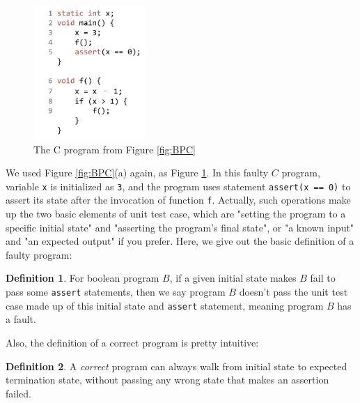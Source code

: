 \documentclass[10pt,journal,final,]{article}
\theoremstyle{definition}
\newtheorem{definition}{Definition}[section]
\begin{document}
\begin{figure}
\centering
\includegraphics[width=1.7in,height=2in]{Fig3-1.jpg}
\caption{The C program from Figure \ref{fig:BPC}}
\label{fig:FC}
\end{figure}

We used Figure \ref{fig:BPC}(a) again, as Figure \ref{fig:FC}. In this faulty $C$ program, variable \lstinline|x| is initialized as \lstinline|3|, and the program uses statement \lstinline|assert(x == 0)| to assert its state after the invocation of function \lstinline|f|.
Actually, such operations make up the two basic elements of unit test case, which are "setting the program to a specific initial state" and "asserting the program's final state", or "a known input" and "an expected output" if you prefer.
Here, we give out the basic definition of a faulty program:

\begin{definition}
\label{definition:FaultyProgram}
For boolean program $B$, if a given initial state makes $B$ fail to pass some \lstinline|assert| statements, then we say program $B$ doesn't pass the unit test case made up of this initial state and \lstinline|assert| statement,
meaning program $B$ has a fault.
\end{definition}

Also, the definition of a correct program is pretty intuitive:

\begin{definition}
\label{definition:CorrectProgram}
A {\it correct} program can always walk from initial state to expected termination state, without passing any wrong state that makes an assertion failed.
\end{definition}
\end{document}
